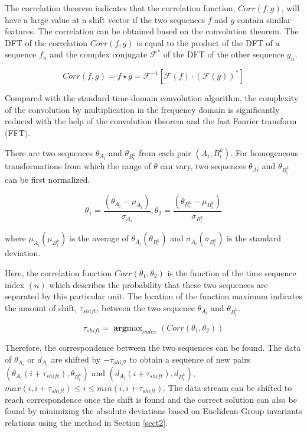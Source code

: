 \documentclass[letterpaper, 10 pt, conference]{ieeeconf}  %
\begin{document}
The correlation theorem indicates that the correlation function, $Corr(f,g)$, will have a large value at a shift vector if the two sequences $f$ and $g$ contain similar features. The correlation can be obtained based on the convolution theorem. The DFT of the correlation $Corr(f,g)$ is equal to the product of the DFT of a sequence $f_{n}$ and the complex conjugate $\mathcal{F}^{*}$ of the DFT of the other sequence $g_n$.

\begin{equation}\label{equ25}
    Corr(f,g)=f \star g = \mathcal{F}^{-1}[\mathcal{F}(f) \cdot (\mathcal{F}(g))^{*}]
\end{equation}

Compared with the standard time-domain convolution algorithm, the complexity of the convolution by multiplication in the frequency domain is significantly reduced with the help of the convolution theorem and the fast Fourier transform (FFT).

There are two sequences $\theta_{A_{i}}$ and $\theta_{B_{i}^{k}}$ from each pair $(A_{i},B_{i}^{k})$. For homogeneous transformations from which the range of $\theta$ can vary, two sequences $\theta_{Ai}$ and $\theta_{B_{i}^{k}}$ can be first normalized.

\begin{equation}\label{equ26}
    \theta_{1}=\frac{(\theta_{A_{i}}-\mu_{A_{i}})}{\sigma_{A_{i}}}, \theta_{2}=\frac{(\theta_{B_{i}^{k}}-\mu_{B_{i}^{k}})}{\sigma_{B_{i}^{k}}}
\end{equation}

where $\mu_{A_{i}}(\mu_{B_{i}^{k}})$ is the average of $\theta_{A_{i}}(\theta_{B_{i}^{k}})$ and $\sigma_{A_{i}}(\sigma_{B_{i}^{k}})$ is the standard deviation.

Here, the correlation function $Corr(\theta_{1},\theta_{2})$  is the function of the time sequence index $(n)$ which describes the probability that these two sequences are separated by this particular unit. The location of the function maximum indicates the amount of shift, $\tau_{shift}$, between the two sequence $\theta_{A_{i}}$ and $\theta_{B_{i}^{k}}$.

\begin{equation}\label{equ27}
    \tau_{shift} = \mathop{\mathbf{arg}max}_{index}(Corr(\theta_{1},\theta_{2}))
\end{equation}

Therefore, the correspondence between the two sequences can be found. The data of $\theta_{A_{i}}$ or $d_{A_{i}}$ are shifted by $-\tau_{shift}$ to obtain a sequence of new pairs $(\theta_{A_{i}}(i+\tau_{shift}),\theta_{B_{i}^{k}})$ and $(d_{A_{i}}(i+\tau_{shift}),d_{B_{i}^{k}})$, $max(i,i+\tau_{shift})\leq i \leq min(i,i+\tau_{shift})$. The data stream can be shifted to reach correspondence once the shift is found and the correct solution can also be found by minimizing the absolute deviations based on Euclidean-Group invariants relations using the method in Section \ref{sect2}.
\end{document}
